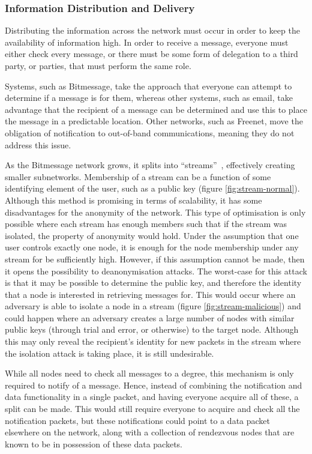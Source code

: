 		\subsubsection{Information Distribution and Delivery}
			Distributing the information across the network must occur in order to keep the availability of information high. In order to receive a message, everyone must either check every message, or there must be some form of delegation to a third party, or parties, that must perform the same role.
			
			Systems, such as Bitmessage, take the approach that everyone can attempt to determine if a message is for them, whereas other systems, such as email, take advantage that the recipient of a message can be determined and use this to place the message in a predictable location. Other networks, such as Freenet, move the obligation of notification to out-of-band communications, meaning they do not address this issue.
			
			As the Bitmessage network grows, it splits into ``streams''~\cite{bitmsg}, effectively creating smaller subnetworks. Membership of a stream can be a function of some identifying element of the user, such as a public key (figure \ref{fig:stream-normal}). Although this method is promising in terms of scalability, it has some disadvantages for the anonymity of the network. This type of optimisation is only possible where each stream has enough members such that if the stream was isolated, the property of anonymity would hold. Under the assumption that one user controls exactly one node, it is enough for the node membership under any stream for be sufficiently high. However, if this assumption cannot be made, then it opens the possibility to deanonymisation attacks. The worst-case for this attack is that it may be possible to determine the public key, and therefore the identity that a node is interested in retrieving messages for. This would occur where an adversary is able to isolate a node in a stream (figure \ref{fig:stream-malicious}) and could happen where an adversary creates a large number of nodes with similar public keys (through trial and error, or otherwise) to the target node. Although this may only reveal the recipient's identity for new packets in the stream where the isolation attack is taking place, it is still undesirable.
			
			
			
			While all nodes need to check all messages to a degree, this mechanism is only required to notify of a message. Hence, instead of combining the notification and data functionality in a single packet, and having everyone acquire all of these, a split can be made. This would still require everyone to acquire and check all the notification packets, but these notifications could point to a data packet elsewhere on the network, along with a collection of rendezvous nodes that are known to be in possession of these data packets.
			
